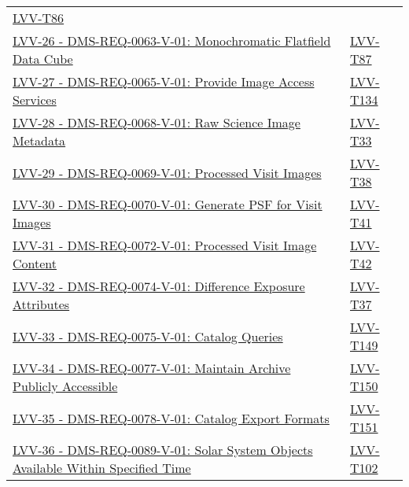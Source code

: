\begin{longtable}[]{p{13cm}p{3cm}}
\protect\hyperlink{lvv-t86---verify-implementation-of-illumination-correction-frame-dms-req-0062}{LVV-T86}\tabularnewline
\href{https://jira.lsstcorp.org/browse/LVV-26}{LVV-26 -
DMS-REQ-0063-V-01: Monochromatic Flatfield Data Cube} &
\protect\hyperlink{lvv-t87---verify-implementation-of-monochromatic-flatfield-data-cube-dms-req-0063}{LVV-T87}\tabularnewline
\href{https://jira.lsstcorp.org/browse/LVV-27}{LVV-27 -
DMS-REQ-0065-V-01: Provide Image Access Services} &
\protect\hyperlink{lvv-t134---verify-implementatino-of-provide-image-access-services-dms-req-0065}{LVV-T134}\tabularnewline
\href{https://jira.lsstcorp.org/browse/LVV-28}{LVV-28 -
DMS-REQ-0068-V-01: Raw Science Image Metadata} &
\protect\hyperlink{lvv-t33---verify-implementation-of-raw-science-image-metadata-dms-req-0068}{LVV-T33}\tabularnewline
\href{https://jira.lsstcorp.org/browse/LVV-29}{LVV-29 -
DMS-REQ-0069-V-01: Processed Visit Images} &
\protect\hyperlink{lvv-t38---verify-implementation-of-processed-visit-images-dms-req-0069}{LVV-T38}\tabularnewline
\href{https://jira.lsstcorp.org/browse/LVV-30}{LVV-30 -
DMS-REQ-0070-V-01: Generate PSF for Visit Images} &
\protect\hyperlink{lvv-t41---verify-implementation-of-generate-psf-for-visit-images-dms-req-0070}{LVV-T41}\tabularnewline
\href{https://jira.lsstcorp.org/browse/LVV-31}{LVV-31 -
DMS-REQ-0072-V-01: Processed Visit Image Content} &
\protect\hyperlink{lvv-t42---verify-implementation-of-processed-visit-image-content-dms-req-0072}{LVV-T42}\tabularnewline
\href{https://jira.lsstcorp.org/browse/LVV-32}{LVV-32 -
DMS-REQ-0074-V-01: Difference Exposure Attributes} &
\protect\hyperlink{lvv-t37---verify-implementation-of-difference-exposure-attributes-dms-req-0074}{LVV-T37}\tabularnewline
\href{https://jira.lsstcorp.org/browse/LVV-33}{LVV-33 -
DMS-REQ-0075-V-01: Catalog Queries} &
\protect\hyperlink{lvv-t149---verify-implementation-of-catalog-queries-dms-req-0075}{LVV-T149}\tabularnewline
\href{https://jira.lsstcorp.org/browse/LVV-34}{LVV-34 -
DMS-REQ-0077-V-01: Maintain Archive Publicly Accessible} &
\protect\hyperlink{lvv-t150---verify-implementation-of-maintain-archive-publicly-accessible-dms-req-0077}{LVV-T150}\tabularnewline
\href{https://jira.lsstcorp.org/browse/LVV-35}{LVV-35 -
DMS-REQ-0078-V-01: Catalog Export Formats} &
\protect\hyperlink{lvv-t151---verify-implementation-of-catalog-export-formats-dms-req-0078}{LVV-T151}\tabularnewline
\href{https://jira.lsstcorp.org/browse/LVV-36}{LVV-36 -
DMS-REQ-0089-V-01: Solar System Objects Available Within Specified Time}
&
\protect\hyperlink{lvv-t102---verify-implementation-of-solar-system-objects-available-within-specified-time-dms-req-0089}{LVV-T102}\tabularnewline

\end{longtable}
